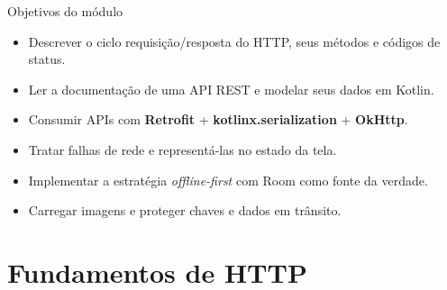 \documentclass[aspectratio=169,10pt]{beamer}
\begin{document}
\capa

\begin{frame}{Objetivos do módulo}
  \begin{conceito}
    \begin{itemize}
      \item Descrever o ciclo requisição/resposta do HTTP, seus métodos e códigos de status.
      \item Ler a documentação de uma API REST e modelar seus dados em Kotlin.
      \item Consumir APIs com \textbf{Retrofit} + \textbf{kotlinx.serialization} + \textbf{OkHttp}.
      \item Tratar falhas de rede e representá-las no estado da tela.
      \item Implementar a estratégia \emph{offline-first} com Room como fonte da verdade.
      \item Carregar imagens e proteger chaves e dados em trânsito.
    \end{itemize}
  \end{conceito}
\end{frame}

\sumario

\section{Fundamentos de HTTP}
\end{document}
